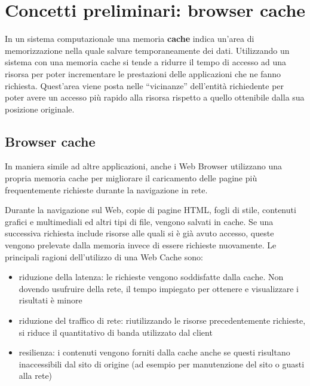 \chapter{Concetti preliminari: browser cache}

In un sistema computazionale una memoria \textbf{cache} indica un'area di memorizzazione nella quale salvare temporaneamente dei dati.
Utilizzando un sistema con una memoria cache si tende a ridurre il tempo di accesso ad una risorsa per poter incrementare le prestazioni delle applicazioni che ne fanno richiesta. 
Quest'area viene posta nelle ``vicinanze'' dell'entità richiedente per poter avere un accesso più rapido alla risorsa rispetto a quello ottenibile dalla sua posizione originale.
 
\section {Browser cache}

In maniera simile ad altre applicazioni, anche i Web Browser utilizzano una propria memoria cache per migliorare il caricamento delle pagine più frequentemente richieste durante la navigazione in rete. \nocite{Elling}

Durante la navigazione sul Web, copie di pagine HTML, fogli di stile, contenuti grafici e multimediali ed altri tipi di file, vengono salvati in cache. Se una successiva richiesta include risorse alle quali si è già avuto accesso, queste vengono prelevate dalla memoria invece di essere richieste nuovamente. Le principali ragioni dell'utilizzo di una Web Cache sono:
\nocite{Nottingham}

\begin{itemize}
	
	\item{riduzione della latenza: le richieste vengono soddisfatte dalla cache. Non dovendo usufruire della rete, il tempo impiegato per ottenere e visualizzare i risultati è minore}
	
	\item{riduzione del traffico di rete: riutilizzando le risorse precedentemente richieste, si riduce il quantitativo di banda utilizzato dal client}
	
	\item{resilienza: i contenuti vengono forniti dalla cache anche se questi risultano inaccessibili dal sito di origine (ad esempio per manutenzione del sito o guasti alla rete)}

\end{itemize}

